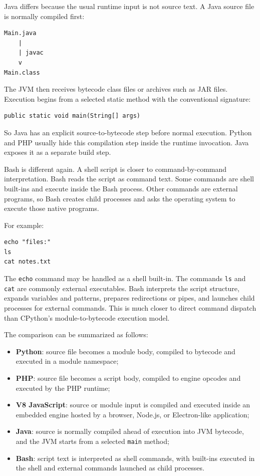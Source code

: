 Java differs because the usual runtime input is not source text. A Java source file is normally compiled first:

\begin{verbatim}
Main.java
    |
    | javac
    v
Main.class
\end{verbatim}

The JVM then receives bytecode class files or archives such as JAR files. Execution begins from a selected static method with the conventional signature:

\begin{verbatim}
public static void main(String[] args)
\end{verbatim}

So Java has an explicit source-to-bytecode step before normal execution. Python and PHP usually hide this compilation step inside the runtime invocation. Java exposes it as a separate build step.

Bash is different again. A shell script is closer to command-by-command interpretation. Bash reads the script as command text. Some commands are shell built-ins and execute inside the Bash process. Other commands are external programs, so Bash creates child processes and asks the operating system to execute those native programs.

For example:

\begin{verbatim}
echo "files:"
ls
cat notes.txt
\end{verbatim}

The \texttt{echo} command may be handled as a shell built-in. The commands \texttt{ls} and \texttt{cat} are commonly external executables. Bash interprets the script structure, expands variables and patterns, prepares redirections or pipes, and launches child processes for external commands. This is much closer to direct command dispatch than CPython's module-to-bytecode execution model.

The comparison can be summarized as follows:

\begin{itemize}
    \item \textbf{Python}: source file becomes a module body, compiled to bytecode and executed in a module namespace;
    \item \textbf{PHP}: source file becomes a script body, compiled to engine opcodes and executed by the PHP runtime;
    \item \textbf{V8 JavaScript}: source or module input is compiled and executed inside an embedded engine hosted by a browser, Node.js, or Electron-like application;
    \item \textbf{Java}: source is normally compiled ahead of execution into JVM bytecode, and the JVM starts from a selected \texttt{main} method;
    \item \textbf{Bash}: script text is interpreted as shell commands, with built-ins executed in the shell and external commands launched as child processes.
\end{itemize}

